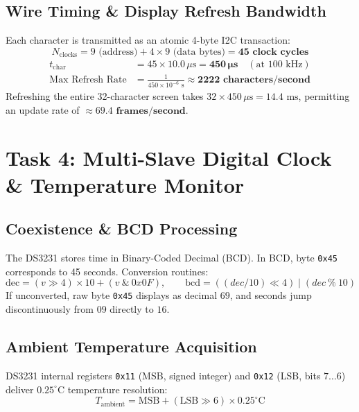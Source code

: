 \documentclass[11pt,a4paper,oneside]{report}
\begin{document}
\section{Wire Timing \& Display Refresh Bandwidth}
Each character is transmitted as an atomic 4-byte I2C transaction:
\begin{equation}
N_{\text{clocks}} = 9\text{ (address)} + 4 \times 9\text{ (data bytes)} = \mathbf{45\text{ clock cycles}}
\end{equation}
\begin{align}
t_{\text{char}} &= 45 \times 10.0\,\mu\text{s} = \mathbf{450\,\mu\text{s}} \quad (\text{at } 100\text{ kHz}) \\
\text{Max Refresh Rate} &= \frac{1}{450\times 10^{-6}\text{ s}} \approx \mathbf{2222\text{ characters/second}}
\end{align}
Refreshing the entire 32-character screen takes $32 \times 450\,\mu\text{s} = 14.4\text{ ms}$, permitting an update rate of $\approx \mathbf{69.4\text{ frames/second}}$.

\chapter{Task 4: Multi-Slave Digital Clock \& Temperature Monitor}

\section{Coexistence \& BCD Processing}
The DS3231 stores time in Binary-Coded Decimal (BCD). In BCD, byte \texttt{0x45} corresponds to 45 seconds. Conversion routines:
\begin{equation}
\text{dec} = (v \gg 4) \times 10 + (v \ \& \ 0x0F), \qquad \text{bcd} = ((dec / 10) \ll 4) \;|\; (dec \ \% \ 10)
\end{equation}
If unconverted, raw byte \texttt{0x45} displays as decimal $69$, and seconds jump discontinuously from $09$ directly to $16$.

\section{Ambient Temperature Acquisition}
DS3231 internal registers \texttt{0x11} (MSB, signed integer) and \texttt{0x12} (LSB, bits $7\dots 6$) deliver $0.25^\circ\text{C}$ temperature resolution:
\begin{equation}
T_{\text{ambient}} = \text{MSB} + (\text{LSB} \gg 6) \times 0.25^\circ\text{C}
\end{equation}
\end{document}
